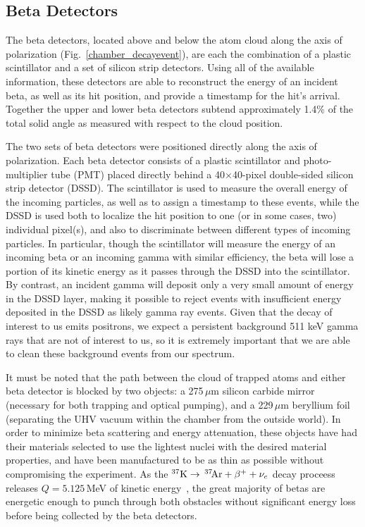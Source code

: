 \subsection{Beta Detectors}
\label{section:betadetectors}
The beta detectors, located above and below the atom cloud along the axis of polarization (Fig.~\ref{chamber_decayevent}), are each the combination of a plastic scintillator and a set of silicon strip detectors.  Using all of the available information, these detectors are able to reconstruct the energy of an incident beta, as well as its hit position, and provide a timestamp for the hit's arrival.  Together the upper and lower beta detectors subtend approximately 1.4\% of the total solid angle as measured with respect to the cloud position. 

	The two sets of beta detectors were positioned directly along the axis of polarization.  Each beta detector consists of a plastic scintillator and photo-multiplier tube (PMT)  placed directly behind a 40$\times$40-pixel double-sided silicon strip detector (DSSD).    The scintillator is used to measure the overall energy of the incoming particles, as well as to assign a timestamp to these events, while the DSSD is used both to localize the hit position to one (or in some cases, two) individual pixel(s), and also to discriminate between different types of incoming particles.  In particular, though the scintillator will measure the energy of an incoming beta or an incoming gamma with similar efficiency, the beta will lose a portion of its kinetic energy as it passes through the DSSD into the scintillator.  By contrast, an incident gamma will deposit only a very small amount of energy in the DSSD layer, making it possible to reject events with insufficient energy deposited in the DSSD as likely gamma ray events.  Given that the decay of interest to us emits positrons, we expect a persistent background 511 keV gamma rays that are not of interest to us, so it is extremely important that we are able to clean these background events from our spectrum. 


It must be noted that the path between the cloud of trapped atoms and either beta detector is blocked by two objects:  a 275$\,\mu$m silicon carbide mirror (necessary for both trapping and optical pumping), and a 229$\,\mu$m beryllium foil (separating the UHV vacuum within the chamber from the outside world).  In order to minimize beta scattering and energy attenuation, these objects have had their materials selected to use the lightest nuclei with the desired material properties, and have been manufactured to be as thin as possible without compromising the experiment.  As the $^{37}\textrm{K} \rightarrow \,^{37}\textrm{\!Ar} + \beta^{+} + \nu_e$ decay proceess releases $Q=5.125$\,MeV of kinetic energy~\cite{Q_value}, the great majority of betas are energetic enough to punch through both obstacles without significant energy loss before being collected by the beta detectors.  




